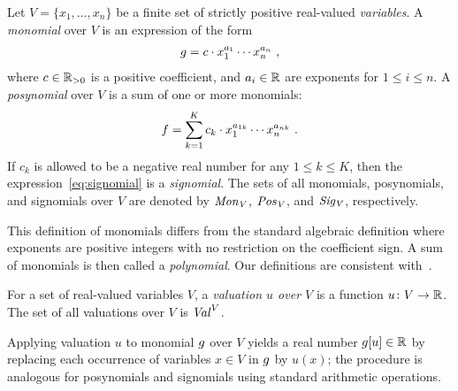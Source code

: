 %
\begin{definition}\label{def:posy}
  Let $V=\{x_1,\ldots,x_n\}$ be a finite set of strictly positive real-valued \emph{variables}.
  A \emph{monomial} over $V$ is an expression of the form
  \begin{align*}
      \mono=c\cdot x_{1}^{a_{1}}\cdots x_{n}^{a_{n}}\ ,
  \end{align*}
  where $c\in \R_{>0} $ is a positive coefficient, and $a_i\in\R$ are exponents for $1\leq i\leq n$. 
  A \emph{posynomial} over $V$ is a sum of one or more monomials:
  \begin{align}
      \posy=\sum_{k=1}^K c_k\cdot x_1^{a_{1k}}\cdots x_n^{a_{nk}} \ .\label{eq:signomial}
  \end{align}
  If $c_k$ is allowed to be a negative real number for any $1\leq k\leq K$, then the expression~\eqref{eq:signomial} is a \emph{signomial}. The sets of all monomials, posynomials, and signomials over $V$ are denoted by $\monos[V]$, $\posys[V]$, and $\signomis[V]$, respectively.
 \end{definition}
%
This definition of monomials differs from the standard algebraic definition where exponents are positive integers with no restriction on the coefficient sign. A sum of monomials is then called a \emph{polynomial}. Our definitions are consistent with~\cite{boyd2007tutorial}.
\begin{definition}[Valuation]
  \label{def:valuation}
  For a set of real-valued variables $V$, a \emph{valuation $u$ over $V$} is a function $u\colon V \rightarrow \R$.
  The set of all valuations over $V$ is $\valuations^V$.
\end{definition}
 Applying valuation $u$ to monomial $\mono$ over $V$ yields a real number $\mono[u]\in\R$ by replacing each occurrence of variables $x\in V$ in $\mono$ by $u(x)$; the procedure is analogous for posynomials and signomials using standard arithmetic operations.

